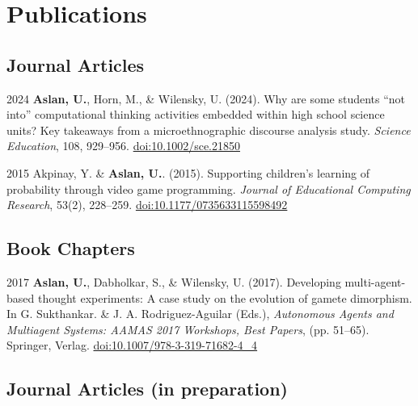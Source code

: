 \documentclass[11pt,letterpaper]{report} %
\begin{document}
    \section*{Publications}

    \subsection*{Journal Articles}

    \begin{tablist}

        \item[2024] \tab{}\textbf{Aslan, U.}, Horn, M., \& Wilensky, U. (2024). Why are some students \enquote{not into} computational thinking activities embedded within high school science units? Key takeaways from a microethnographic discourse analysis study. \textit{Science Education}, 108, 929--956. \href{https://doi.org/10.1002/sce.21850}{doi:10.1002/sce.21850}

        \item[2015] \tab{}Akpinay, Y. \& \textbf{Aslan, U.}. (2015). Supporting children's learning of probability through video game programming. \textit{Journal of Educational Computing Research}, 53(2), 228--259. \href{https://doi.org/10.1177/0735633115598492}{doi:10.1177/0735633115598492}

    \end{tablist}



    \subsection*{Book Chapters}

    \begin{tablist}

        \item[2017] \tab{}\textbf{Aslan, U.}, Dabholkar, S., \& Wilensky, U. (2017). Developing multi-agent-based thought experiments: A case study on the evolution of gamete dimorphism. In G. Sukthankar. \& J. A. Rodriguez-Aguilar (Eds.), \textit{Autonomous Agents and Multiagent Systems: AAMAS 2017 Workshops, Best Papers}, (pp. 51--65). Springer, Verlag. \href{https://doi.org/10.1007/978-3-319-71682-4\_4}{doi:10.1007/978-3-319-71682-4\_4}

    \end{tablist}

    \subsection*{Journal Articles (in preparation)}
\end{document}
